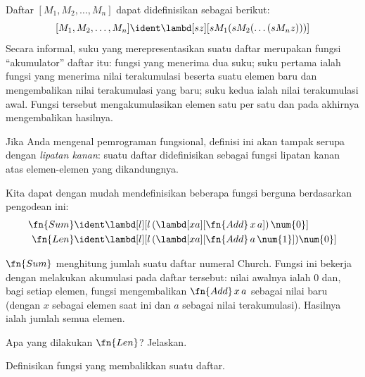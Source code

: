 \documentclass[../../../include/open-logic-section]{subfiles}
\begin{document}

Daftar $[M_1, M_2, \ldots, M_n]$ dapat didefinisikan sebagai berikut:
\[
  [M_1, M_2, \ldots, M_n] \ident \lambd[sz][s M_1 (s M_2 (\ldots (s M_n z)))]
\]
Secara informal, suku yang merepresentasikan suatu daftar merupakan fungsi
``akumulator'' daftar itu: fungsi yang menerima dua suku; suku pertama ialah
fungsi yang menerima nilai terakumulasi beserta suatu elemen baru dan
mengembalikan nilai terakumulasi yang baru; suku kedua ialah nilai
terakumulasi awal. Fungsi tersebut mengakumulasikan elemen satu per satu dan
pada akhirnya mengembalikan hasilnya.

\begin{digress}
  Jika Anda mengenal pemrograman fungsional, definisi ini akan tampak serupa
  dengan \emph{lipatan kanan}: suatu daftar didefinisikan
  sebagai fungsi lipatan kanan atas elemen-elemen yang dikandungnya.
\end{digress}

Kita dapat dengan mudah mendefinisikan beberapa fungsi berguna berdasarkan
pengodean ini:
\begin{align*}
  \fn{Sum} & \ident
  \lambd[l][l \, (\lambd[xa][\fn{Add} \, x \, a])\,  \num{0}]\\
  \fn{Len} & \ident
  \lambd[l][l \, (\lambd[xa][\fn{Add} \, a \, \num{1}]) \num{0}]
\end{align*}

$\fn{Sum}$ menghitung jumlah suatu daftar numeral Church. Fungsi ini bekerja
dengan melakukan akumulasi pada daftar tersebut: nilai awalnya ialah
$\num{0}$ dan, bagi setiap elemen, fungsi mengembalikan $\fn{Add} \, x\, a$
sebagai nilai baru (dengan $x$ sebagai elemen saat ini dan $a$ sebagai nilai
terakumulasi). Hasilnya ialah jumlah semua elemen.

\begin{prob}
  Apa yang dilakukan $\fn{Len}$? Jelaskan.
\end{prob}

\begin{prob}
  Definisikan fungsi yang membalikkan suatu daftar.
\end{prob}
\end{document}
